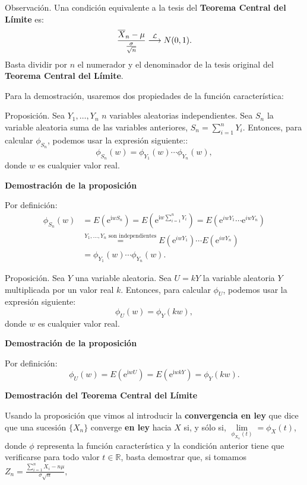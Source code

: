 \documentclass[
  letterpaper,
  DIV=11,
  numbers=noendperiod]{scrreprt}
\begin{document}
Observación. Una condición equivalente a la tesis del \textbf{Teorema
Central del Límite} es: \[
\frac{\overline{X}_n-\mu}{\frac{\sigma}{\sqrt{n}}}\stackrel{{\cal L}}{\longrightarrow} N(0,1).
\] Basta dividir por \(n\) el numerador y el denominador de la tesis
original del \textbf{Teorema Central del Límite}.

Para la demostración, usaremos dos propiedades de la función
característica:

Proposición. Sea \(Y_1,\ldots, Y_n\) \(n\) variables aleatorias
independientes. Sea \(S_n\) la variable aleatoria suma de las variables
anteriores, \(S_n=\sum\limits_{i=1}^n Y_i\). Entonces, para calcular
\(\phi_{S_n}\), podemos usar la expresión siguiente:: \[
\phi_{S_n}(w)=\phi_{Y_1}(w)\cdots \phi_{Y_n}(w),
\] donde \(w\) es cualquier valor real.

\textbf{Demostración de la proposición}

Por definición: \[
\begin{array}{rl}
\phi_{S_n}(w) & =E\left(\mathrm{e}^{\mathrm{i} w S_n}\right)=E\left(\mathrm{e}^{\mathrm{i} w \sum\limits_{i=1}^n Y_i}\right) = E\left(\mathrm{e}^{i w Y_1}\cdots \mathrm{e}^{i w Y_n}\right)\\ & \stackrel{\mbox{$Y_1,\ldots,Y_n$ son independientes}}{=} E\left(\mathrm{e}^{i w Y_1}\right)\cdots E\left(\mathrm{e}^{i w Y_n}\right) \\
& =\phi_{Y_1}(w)\cdots \phi_{Y_n}(w).
\end{array}
\]

Proposición. Sea \(Y\) una variable aleatoria. Sea \(U=kY\) la variable
aleatoria \(Y\) multiplicada por un valor real \(k\). Entonces, para
calcular \(\phi_{U}\), podemos usar la expresión siguiente: \[
\phi_{U}(w)=\phi_Y(kw),
\] donde \(w\) es cualquier valor real.

\textbf{Demostración de la proposición}

Por definición: \[
\phi_{U}(w)=E\left(\mathrm{e}^{\mathrm{i} w U}\right) = E\left(\mathrm{e}^{\mathrm{i} w k Y}\right)=\phi_Y(kw).
\]

\textbf{Demostración del Teorema Central del Límite}

Usando la proposición que vimos al introducir la \textbf{convergencia en
ley} que dice que una sucesión \(\{X_n\}\) converge \textbf{en ley}
hacia \(X\) si, y sólo si, \(\lim\limits_{\phi_{X_n}(t)}=\phi_{X}(t)\),
donde \(\phi\) representa la función característica y la condición
anterior tiene que verificarse para todo valor \(t\in\mathbb{R}\), basta
demostrar que, si tomamos
\(Z_n = \frac{\sum\limits_{i=1}^n X_i-n\mu}{\sigma\sqrt{n}},\)
\end{document}
